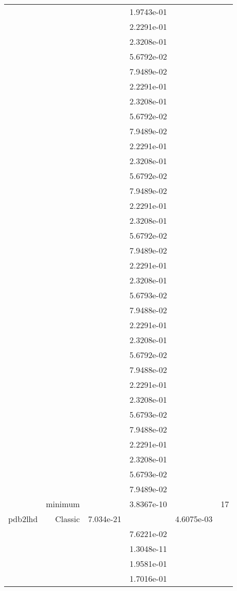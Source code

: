 \begin{xltabular}{\textwidth}{r|rS[table-format=1.3e+2]S[table-format=1.4e+2]S[table-format=1.4e+2]S[table-format=-1.5]}
&  &  & 1.9743e-01 & & \\
&  &  & 2.2291e-01 & & \\
&  &  & 2.3208e-01 & & \\
&  &  & 5.6792e-02 & & \\
&  &  & 7.9489e-02 & & \\
&  &  & 2.2291e-01 & & \\
&  &  & 2.3208e-01 & & \\
&  &  & 5.6792e-02 & & \\
&  &  & 7.9489e-02 & & \\
&  &  & 2.2291e-01 & & \\
&  &  & 2.3208e-01 & & \\
&  &  & 5.6792e-02 & & \\
&  &  & 7.9489e-02 & & \\
&  &  & 2.2291e-01 & & \\
&  &  & 2.3208e-01 & & \\
&  &  & 5.6792e-02 & & \\
&  &  & 7.9489e-02 & & \\
&  &  & 2.2291e-01 & & \\
&  &  & 2.3208e-01 & & \\
&  &  & 5.6793e-02 & & \\
&  &  & 7.9488e-02 & & \\
&  &  & 2.2291e-01 & & \\
&  &  & 2.3208e-01 & & \\
&  &  & 5.6792e-02 & & \\
&  &  & 7.9488e-02 & & \\
&  &  & 2.2291e-01 & & \\
&  &  & 2.3208e-01 & & \\
&  &  & 5.6793e-02 & & \\
&  &  & 7.9488e-02 & & \\
&  &  & 2.2291e-01 & & \\
&  &  & 2.3208e-01 & & \\
&  &  & 5.6793e-02 & & \\
&  &  & 7.9489e-02 & & \\
& minimum &  & 3.8367e-10 & & 17 \\  \addlinespace
pdb2lhd & Classic & 7.034e-21 &  & 4.6075e-03 & \\
&  &  & 7.6221e-02 & & \\
&  &  & 1.3048e-11 & & \\
&  &  & 1.9581e-01 & & \\
&  &  & 1.7016e-01 & & \\

\end{xltabular}
